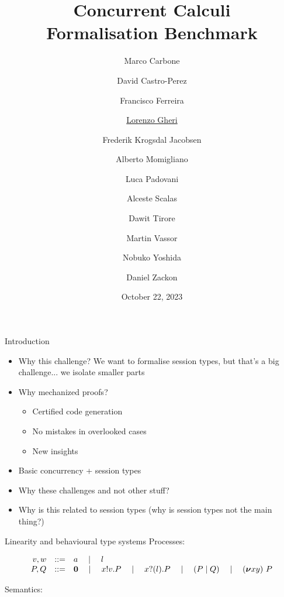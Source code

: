 \documentclass[aspectratio=169,hyperref={pdfpagelabels=false}]{beamer}
\title[Concurrent Calculi Formalisation Benchmark]{\texorpdfstring{Concurrent Calculi\\Formalisation Benchmark}{Concurrent Calculi Formalisation Benchmark}}
\author{Marco Carbone
\and David Castro-Perez
\and Francisco Ferreira
\and \texorpdfstring{\underline{Lorenzo Gheri}}{Lorenzo Gheri}
\and Frederik Krogsdal Jacobsen
\and Alberto Momigliano
\and Luca Padovani
\and Alceste Scalas
\and Dawit Tirore
\and Martin Vassor
\and Nobuko Yoshida
\and Daniel Zackon}
\date{October 22, 2023}
\begin{document}
\inserttitlepage

\begin{frame}{Introduction}
  \begin{itemize}
  \item Why this challenge? We want to formalise session types, but that's a big challenge... we isolate smaller parts
  \item Why mechanized proofs?
    \begin{itemize}
    \item Certified code generation
    \item No mistakes in overlooked cases
    \item New insights
    \end{itemize}
  \item Basic concurrency + session types
  \item Why these challenges and not other stuff?
  \item Why is this related to session types (why is session types not the main thing?)
  \end{itemize}
\end{frame}

\begin{frame}{Linearity and behavioural type systems}
  Processes:
  \begin{footnotesize}
\[
\begin{array}{rcl}
  v,w & ::= & a \quad\mid\quad l \\
  P,Q & ::=& \bm{0} \quad\mid\quad x ! v . P \quad\mid\quad x ? (l) . P \quad\mid\quad (P \mid Q) \quad\mid\quad  (\bm{\nu} xy)~P
  \end{array}
\]
  \end{footnotesize}
  
  Semantics:
  \begin{footnotesize}
  \end{footnotesize}


\end{frame}
\end{document}
